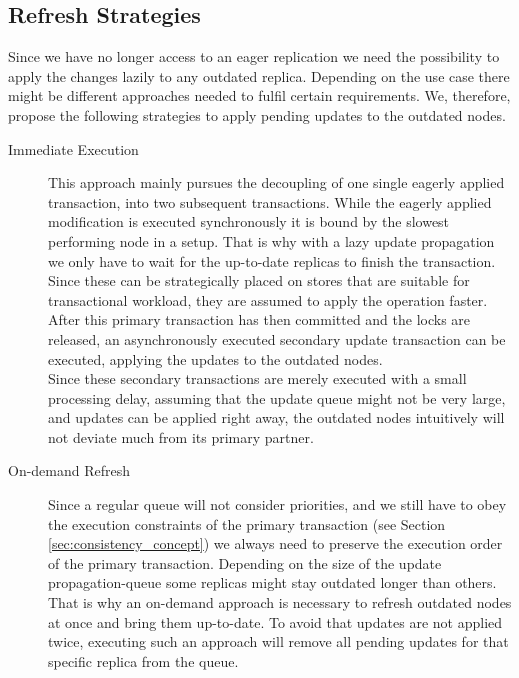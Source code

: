 \subsection{Refresh Strategies}
\label{sec:refresh_strategies}

Since we have no longer access to an eager replication we need the possibility to apply the changes lazily to any outdated replica.
Depending on the use case there might be different approaches needed to fulfil certain requirements.
We, therefore, propose the following strategies to apply pending updates to the outdated nodes.

\begin{description}
    \item[Immediate Execution] This approach mainly pursues the decoupling of one single eagerly applied transaction, into two subsequent transactions.
    While the eagerly applied modification is executed synchronously it is bound by the slowest performing node in a setup.
    That is why with a lazy update propagation we only have to wait for the up-to-date replicas to finish the transaction.
    Since these can be strategically placed on stores that are suitable for transactional workload, they are assumed to apply the operation faster.
    After this primary transaction has then committed and the locks are released, an asynchronously executed secondary update transaction can be executed, 
    applying the updates to the outdated nodes.\\
    Since these secondary transactions are merely executed with a small processing delay, assuming that the update queue might not be very large, 
    and updates can be applied right away, the outdated nodes intuitively will not deviate much from its primary partner.

    \item[On-demand Refresh] Since a regular queue will not consider priorities, and we still have to obey the execution constraints of the primary transaction (see Section \ref{sec:consistency_concept})
    we always need to preserve the execution order of the primary transaction. Depending on the size of the update propagation-queue some replicas might stay outdated longer than others.
    That is why an on-demand approach is necessary to refresh outdated nodes at once and bring them up-to-date.
    To avoid that updates are not applied twice, executing such an approach will remove all pending updates for that specific replica from the queue.
    

\end{description}
